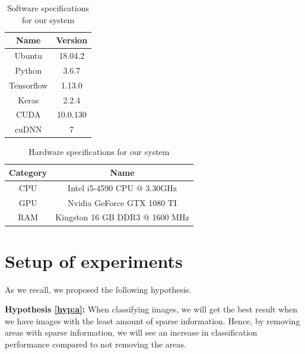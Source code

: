 \begin{table}[]
\centering
\begin{tabular}{@{}cc@{}}
\toprule
\multicolumn{1}{c}{Name} & \multicolumn{1}{c}{Version} \\ \midrule
Ubuntu                   & 18.04.2                 \\
Python                   & 3.6.7                       \\
Tensorflow               & 1.13.0                      \\
Keras                    & 2.2.4                       \\
CUDA                     & 10.0.130                    \\
cuDNN                    & 7                           \\ \bottomrule
\end{tabular}
\caption{Software specifications for our system}
\label{tab:SW}
\end{table}

\begin{table}[]
\centering
\begin{tabular}{@{}cc@{}}
\toprule
\multicolumn{1}{c}{Category} & \multicolumn{1}{c}{Name}       \\ \midrule
CPU                          & Intel i5-4590 CPU @ 3.30GHz    \\
GPU                          & Nvidia GeForce GTX 1080 TI     \\
RAM                          & Kingston 16 GB DDR3 @ 1600 MHz \\ \bottomrule
\end{tabular}
\caption{Hardware specifications for our system}
\label{tab:HW}
\end{table}


\section{Setup of experiments}
As we recall, we proposed the following hypothesis.
\vspace{10px}

\noindent
\textbf{Hypothesis \ref{hyp:a}:}
When classifying images, we will get the best result when we have images with the least amount of sparse information.
Hence, by removing areas with sparse information, we will see an increase in classification performance compared to not removing the areas.

\vspace{5px}


